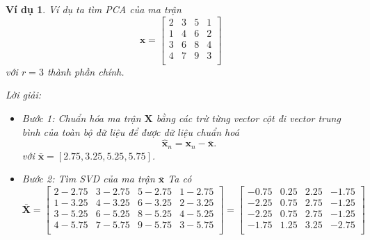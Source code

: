 \documentclass[12pt,a4paper,oneside]{report}
\newtheorem{vd}{Ví dụ} [section]
\numberwithin{equation}{section}
\begin{document}
\begin{vd}
Ví dụ ta tìm PCA của ma trận\[
\mathbf{x} = \begin{bmatrix}
	2 & 3 & 5 & 1 \\
	1 & 4 & 6 & 2 \\
	3 & 6 & 8 & 4 \\
	4 & 7 & 9 & 3 \\
\end{bmatrix}
\] với $r=3$ thành phần chính.

Lời giải:
\begin{itemize}
\item Bước 1: Chuẩn hóa ma trận $\mathbf{X}$ bằng các trừ từng vector cột đi vector trung bình của toàn bộ dữ liệu để được dữ
liệu chuẩn hoá
\begin{equation}
	\hat{\mathbf{x}}_n = \mathbf{x}_n - \bar{\mathbf{x}}.
\end{equation}
với $\bar{\mathbf{x}} = \left[ 2.75, 3.25, 5.25, 5.75 \right]$.

\item Bước 2: Tìm SVD của ma trận $\bar{\mathbf{x}}$
Ta có
$$
\bar{\mathbf{X}}=\begin{bmatrix}
	2-2.75 & 3-2.75 & 5-2.75 & 1-2.75 \\
	1-3.25 & 4-3.25 & 6-3.25 & 2-3.25 \\
	3-5.25 & 6-5.25 & 8-5.25 & 4-5.25 \\
	4-5.75 & 7-5.75 & 9-5.75 & 3-5.75 \\
\end{bmatrix} = \begin{bmatrix}
	-0.75 & 0.25 & 2.25 & -1.75 \\
	-2.25 & 0.75 & 2.75 & -1.25 \\
	-2.25 & 0.75 & 2.75 & -1.25 \\
	-1.75 & 1.25 & 3.25 & -2.75 \\
\end{bmatrix}
$$


\end{itemize}
\end{vd}
\end{document}
